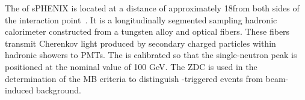 The \zdc of sPHENIX is located at a distance of approximately 18\m from both sides of the interaction point~\cite{Adler:2000bd}. It is a longitudinally segmented sampling hadronic calorimeter constructed from a tungsten alloy and optical fibers. These fibers transmit Cherenkov light produced by secondary charged particles within hadronic showers to PMTs. The \zdc is calibrated so that the single-neutron peak is positioned at the nominal value of 100 GeV. The ZDC is used in the determination of the MB criteria to distinguish \mbd-triggered events from beam-induced background.